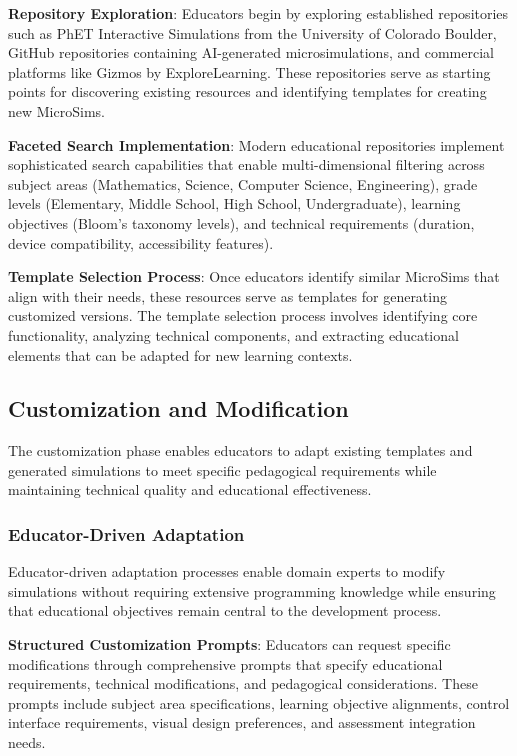 \textbf{Repository Exploration}: Educators begin by exploring established repositories such as PhET Interactive Simulations from the University of Colorado Boulder, GitHub repositories containing AI-generated microsimulations, and commercial platforms like Gizmos by ExploreLearning. These repositories serve as starting points for discovering existing resources and identifying templates for creating new MicroSims.

\textbf{Faceted Search Implementation}: Modern educational repositories implement sophisticated search capabilities that enable multi-dimensional filtering across subject areas (Mathematics, Science, Computer Science, Engineering), grade levels (Elementary, Middle School, High School, Undergraduate), learning objectives (Bloom's taxonomy levels), and technical requirements (duration, device compatibility, accessibility features).

\textbf{Template Selection Process}: Once educators identify similar MicroSims that align with their needs, these resources serve as templates for generating customized versions. The template selection process involves identifying core functionality, analyzing technical components, and extracting educational elements that can be adapted for new learning contexts.

\subsection{Customization and Modification}

The customization phase enables educators to adapt existing templates and generated simulations to meet specific pedagogical requirements while maintaining technical quality and educational effectiveness.

\subsubsection{Educator-Driven Adaptation}

Educator-driven adaptation processes enable domain experts to modify simulations without requiring extensive programming knowledge while ensuring that educational objectives remain central to the development process.

\textbf{Structured Customization Prompts}: Educators can request specific modifications through comprehensive prompts that specify educational requirements, technical modifications, and pedagogical considerations. These prompts include subject area specifications, learning objective alignments, control interface requirements, visual design preferences, and assessment integration needs.

